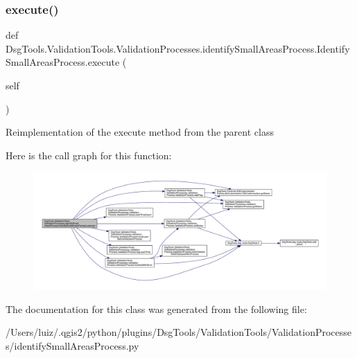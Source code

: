 \subsubsection{\texorpdfstring{execute()}{execute()}}
{\footnotesize\ttfamily def Dsg\+Tools.\+Validation\+Tools.\+Validation\+Processes.\+identify\+Small\+Areas\+Process.\+Identify\+Small\+Areas\+Process.\+execute (\begin{DoxyParamCaption}\item[{}]{self }\end{DoxyParamCaption})}

\begin{DoxyVerb}Reimplementation of the execute method from the parent class
\end{DoxyVerb}
 Here is the call graph for this function\+:
\nopagebreak
\begin{figure}[H]
\begin{center}
\leavevmode
\includegraphics[width=350pt]{class_dsg_tools_1_1_validation_tools_1_1_validation_processes_1_1identify_small_areas_process_1_1_identify_small_areas_process_a31b3dd39570388f0fa9001fc1ec97ae2_cgraph}
\end{center}
\end{figure}


The documentation for this class was generated from the following file\+:\begin{DoxyCompactItemize}
\item 
/\+Users/luiz/.\+qgis2/python/plugins/\+Dsg\+Tools/\+Validation\+Tools/\+Validation\+Processes/identify\+Small\+Areas\+Process.\+py\end{DoxyCompactItemize}
